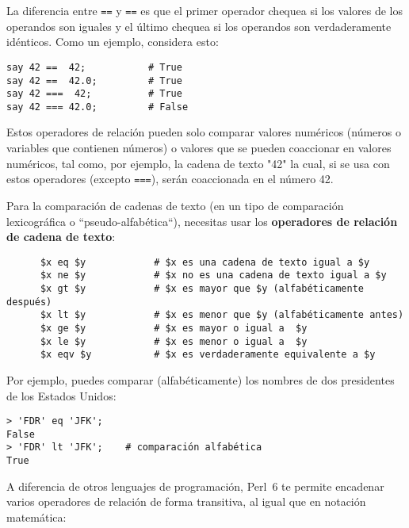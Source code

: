 La diferencia entre {\tt ==} y {\tt ==} es que el primer
operador chequea si los valores de los operandos son iguales
y el último chequea si los  operandos son verdaderamente
idénticos. Como un ejemplo, considera esto:

\begin{verbatim}
say 42 ==  42;           # True
say 42 ==  42.0;         # True
say 42 ===  42;          # True
say 42 === 42.0;         # False
\end{verbatim}
%

Estos operadores de relación pueden solo comparar 
valores numéricos (números o variables que contienen
números) o valores que se pueden coaccionar en 
valores numéricos, tal como, por ejemplo,
la cadena de texto "42" la cual, si se usa con estos
operadores (excepto {\tt ===}), serán coaccionada 
en el número 42.

Para la comparación de cadenas de texto (en un tipo de 
comparación lexicográfica o ``pseudo-alfabética``),
necesitas usar los {\bf operadores de relación de cadena
de texto}:

\begin{verbatim}
      $x eq $y            # $x es una cadena de texto igual a $y
      $x ne $y            # $x no es una cadena de texto igual a $y
      $x gt $y            # $x es mayor que $y (alfabéticamente después)
      $x lt $y            # $x es menor que $y (alfabéticamente antes)
      $x ge $y            # $x es mayor o igual a  $y
      $x le $y            # $x es menor o igual a  $y
      $x eqv $y           # $x es verdaderamente equivalente a $y
\end{verbatim}
%  



Por ejemplo, puedes comparar (alfabéticamente) los nombres
de dos presidentes de los Estados Unidos:
\begin{verbatim}
> 'FDR' eq 'JFK';
False
> 'FDR' lt 'JFK';    # comparación alfabética
True
\end{verbatim}
%  

A diferencia de otros lenguajes de programación, Perl~6 te permite 
encadenar varios operadores de relación de forma transitiva,
al igual que en notación matemática:

